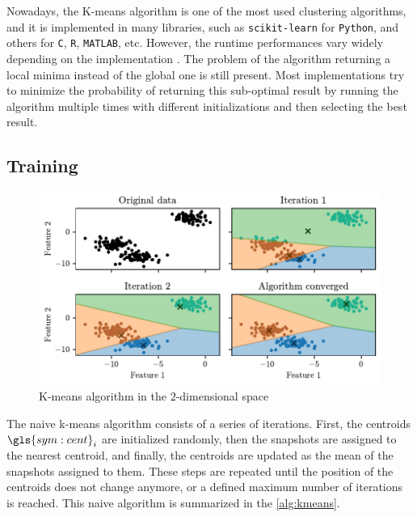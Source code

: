 Nowadays, the K-means algorithm is one of the most used clustering algorithms, and it is implemented in many libraries, such as \texttt{scikit-learn} for \texttt{Python}, and others for \texttt{C}, \texttt{R}, \texttt{MATLAB}, etc. However, the runtime performances vary widely depending on the implementation \cite{Kmeans-performances-Kriegel2017}. The problem of the algorithm returning a local minima instead of the global one is still present. Most implementations try to minimize the probability of returning this sub-optimal result by running the algorithm multiple times with different initializations and then selecting the best result.

\subsection{Training}

\begin{figure}[htbp]
  \centering
  \includegraphics[width=\textwidth]{images/Kmeans_vornoi.pdf}
  \caption{K-means algorithm in the $2$-dimensional space}
  \label{fig:kmeans_vornoi}
\end{figure}

 The naive k-means algorithm consists of a series of iterations. First, the centroids $\gls{sym:cent}_i$ are initialized randomly, then the snapshots are assigned to the nearest centroid, and finally, the centroids are updated as the mean of the snapshots assigned to them. These steps are repeated until the position of the centroids does not change anymore, or a defined maximum number of iterations is reached. This naive algorithm is summarized in the \autoref{alg:kmeans}.


